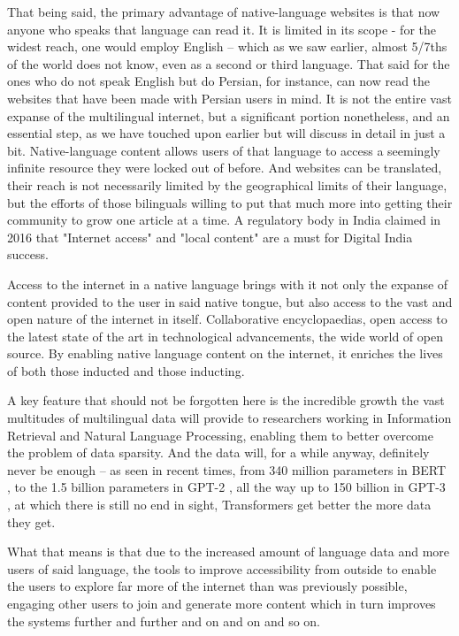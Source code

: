 \documentclass[11pt]{article}
\begin{document}
That being said, the primary advantage of native-language websites is that now
anyone who speaks that language can read it. It is limited in its scope - for
the widest reach, one would employ English -- which as we saw earlier, almost
5/7ths of the world does not know, even as a second or third language. That said
for the ones who do not speak English but do Persian, for instance, can now read
the websites that have been made with Persian users in mind. It is not the
entire vast expanse of the multilingual internet, but a significant portion
nonetheless, and an essential step, as we have touched upon earlier but will
discuss in detail in just a bit. Native-language content allows users of that
language to access a seemingly infinite resource they were locked out of before.
And websites can be translated, their reach is not necessarily limited by the
geographical limits of their language, but the efforts of those bilinguals
willing to put that much more into getting their community to grow one article
at a time. A regulatory body in India \cite{noauthor_internet_2016} claimed in
2016 that "Internet access" and "local content" are a must for Digital India
success.

Access to the internet in a native language brings with it not only the expanse
of content provided to the user in said native tongue, but also access to the
vast and open nature of the internet in itself. Collaborative encyclopaedias,
open access to the latest state of the art in technological advancements, the
wide world of open source. By enabling native language content on the internet,
it enriches the lives of both those inducted and those inducting.

A key feature that should not be forgotten here is the incredible growth the
vast multitudes of multilingual data will provide to researchers working in
Information Retrieval and Natural Language Processing, enabling them to better
overcome the problem of data sparsity. And the data will, for a while anyway,
definitely never be enough -- as seen in recent times, from 340 million
parameters in BERT \cite{devlin_bert_2019}, to the 1.5 billion parameters in
GPT-2 \cite{radford_language_2019}, all the way up to 150 billion in GPT-3
\cite{brown_language_2020}, at which there is still no end in sight,
Transformers get better the more data they get.

What that means is that due to the increased amount of language data and more
users of said language, the tools to improve accessibility from outside to
enable the users to explore far more of the internet than was previously
possible, engaging other users to join and generate more content which in turn
improves the systems further and further and on and on and so on.
\end{document}
